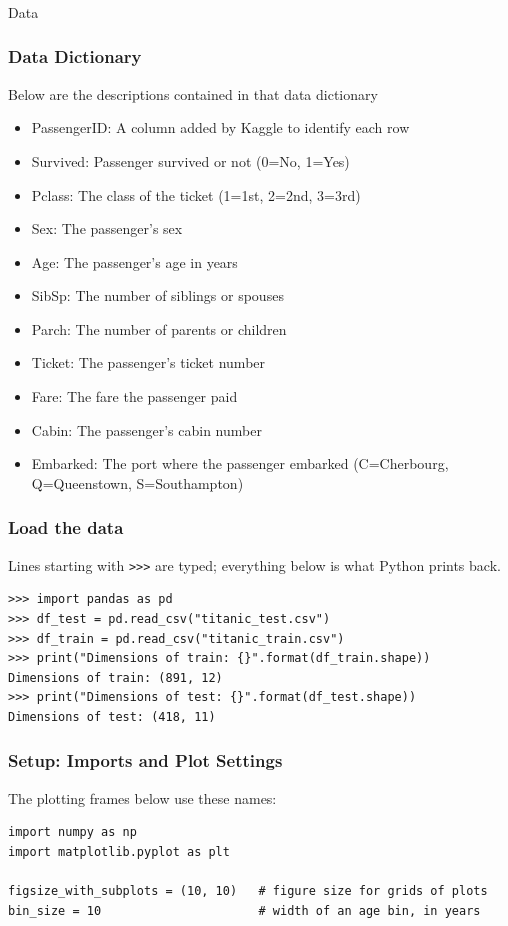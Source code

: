\begin{frame}[fragile]\frametitle{}
\begin{center}
{\Large Data}
\end{center}
\end{frame}


\begin{frame}[fragile]\frametitle{Data Dictionary}
Below are the descriptions contained in that data dictionary
\begin{itemize}
\item PassengerID: A column added by Kaggle to identify each row
\item Survived: Passenger survived or not (0=No, 1=Yes)
\item Pclass: The class of the ticket (1=1st, 2=2nd, 3=3rd)
\item Sex: The passenger's sex
\item Age: The passenger's age in years
\item SibSp: The number of siblings or spouses 
\item Parch: The number of parents or children
\item Ticket: The passenger's ticket number
\item Fare: The fare the passenger paid
\item Cabin: The passenger's cabin number
\item Embarked: The port where the passenger embarked (C=Cherbourg, Q=Queenstown, S=Southampton)
\end{itemize}
\end{frame}



\begin{frame}[fragile]\frametitle{Load the data}
Lines starting with \texttt{>>>} are typed; everything below is what Python prints back.
\begin{lstlisting}
>>> import pandas as pd
>>> df_test = pd.read_csv("titanic_test.csv")
>>> df_train = pd.read_csv("titanic_train.csv")
>>> print("Dimensions of train: {}".format(df_train.shape))
Dimensions of train: (891, 12)
>>> print("Dimensions of test: {}".format(df_test.shape))
Dimensions of test: (418, 11)
\end{lstlisting}
\end{frame}

\begin{frame}[fragile]\frametitle{Setup: Imports and Plot Settings}
The plotting frames below use these names:
\begin{lstlisting}
import numpy as np
import matplotlib.pyplot as plt

figsize_with_subplots = (10, 10)   # figure size for grids of plots
bin_size = 10                      # width of an age bin, in years
\end{lstlisting}
\end{frame}

